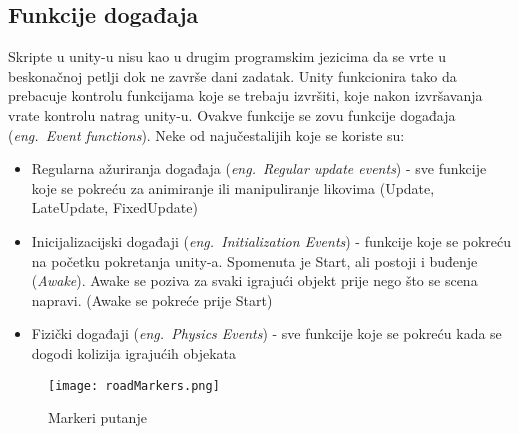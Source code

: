 \subsection{Funkcije događaja}
Skripte u unity-u nisu kao u drugim programskim jezicima da se vrte u beskonačnoj petlji dok ne završe dani zadatak. Unity funkcionira tako da prebacuje kontrolu funkcijama koje se trebaju izvršiti, koje nakon izvršavanja vrate kontrolu natrag unity-u. Ovakve funkcije se zovu funkcije događaja (\emph{eng.~Event functions}). Neke od najučestalijih koje se koriste su:
\begin{itemize} 
	\item Regularna ažuriranja događaja (\emph{eng.~Regular update events}) - sve funkcije koje se pokreću za animiranje ili manipuliranje likovima (Update, LateUpdate, FixedUpdate)
	\item Inicijalizacijski događaji (\emph{eng.~Initialization Events}) - funkcije koje se pokreću na početku pokretanja unity-a. Spomenuta je Start, ali postoji i buđenje (\emph{Awake}). Awake se poziva za svaki igrajući objekt prije nego što se scena napravi. (Awake se pokreće prije Start)
	\item Fizički događaji (\emph{eng.~Physics Events}) - sve funkcije koje se pokreću kada se dogodi kolizija igrajućih objekata
\end{itemize}
\begin{figure}[h]
	\texttt{[image: roadMarkers.png]}
	\centering
	\caption{Markeri putanje}
	\label{fig:markeriPutanje}
\end{figure}
